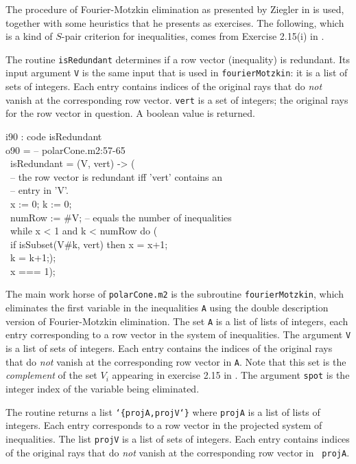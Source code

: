 \medskip
The procedure of Fourier-Motzkin elimination as presented by 
Ziegler in \cite{HS:Zie} is used, together with some heuristics that he
presents as exercises.  The following, which is a kind of $S$-pair
criterion for inequalities, comes from Exercise 2.15(i) in \cite{HS:Zie}.

The routine {\tt isRedundant} determines if a row vector (inequality)
is redundant. Its input argument {\tt V} is the same input that is
used in {\tt fourierMotzkin}: it is a list of sets of integers.  Each
entry contains indices of the original rays that do {\sl not} vanish
at the corresponding row vector.  {\tt vert} is a set of integers; the
original rays for the row vector in question.  A boolean value is
returned.  

\beginOutput
i90 : code isRedundant\\
\emptyLine
o90 = -- polarCone.m2:57-65\\
\      isRedundant = (V, vert) -> (\\
\           -- the row vector is redundant iff 'vert' contains an\\
\           -- entry in 'V'.\\
\           x := 0;            k := 0;\\
\           numRow := #V;      -- equals the number of inequalities\\
\           while x < 1 and k < numRow do (\\
\                if isSubset(V#k, vert) then x = x+1;\\
\                k = k+1;);     \\
\           x === 1);\\
\endOutput

\medskip
The main work horse of {\tt polarCone.m2} is the subroutine 
{\tt fourierMotzkin}, which eliminates the first variable in the
inequalities {\tt A} using the double description version of
Fourier-Motzkin elimination. The set {\tt A} is a list of lists of
integers, each entry corresponding to a row vector in the system of
inequalities.  The argument {\tt V} is a list of sets of integers.
Each entry contains the indices of the original rays that do {\sl
  not} vanish at the corresponding row vector in {\tt A}.  Note that
this set is the {\sl complement} of the set $V_i$ appearing in
exercise 2.15 in \cite{HS:Zie}. The argument {\tt spot} is the integer
index of the variable being eliminated.  

The routine returns a list {\tt \char`\{projA,projV\char`\}} where {\tt projA} is
a list of lists of integers.  Each entry corresponds to a row vector
in the projected system of inequalities.  The list {\tt projV} is a
list of sets of integers.  Each entry contains indices of the original
rays that do {\sl not} vanish at the corresponding row vector in {\tt
  projA}. 

